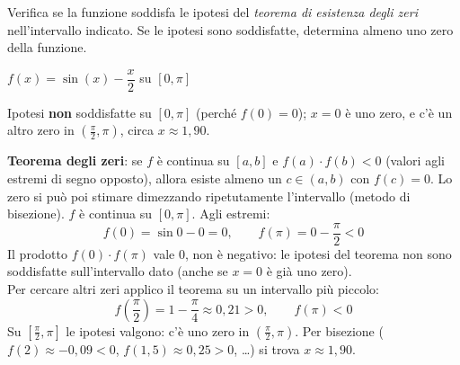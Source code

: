 \begin{question}[ID=3.2, subtitle={Teorema degli zeri per $\sin x - x/2$ su $[0,\pi]$}, tags={continuità, teorema degli zeri}, difficulty=facile]
Verifica se la funzione soddisfa le ipotesi del \textit{teorema di esistenza degli zeri} nell'intervallo indicato. Se le ipotesi sono soddisfatte, determina almeno uno zero della funzione.
\begin{center}
    $f(x) = \sin(x) - \dfrac{x}{2}$ su $[0, \pi]$
\end{center}
\begin{solution}
Ipotesi \textbf{non} soddisfatte su $[0,\pi]$ (perché $f(0)=0$); $x=0$ è uno zero, e c'è un altro zero in $\left(\tfrac\pi2,\pi\right)$, circa $x\approx1{,}90$.
\end{solution}
\begin{explanation}
\textbf{Teorema degli zeri}: se $f$ è continua su $[a,b]$ e $f(a)\cdot f(b)<0$ (valori agli estremi di segno opposto), allora esiste almeno un $c\in(a,b)$ con $f(c)=0$. Lo zero si può poi stimare dimezzando ripetutamente l'intervallo (metodo di bisezione).
$f$ è continua su $[0,\pi]$. Agli estremi:
\[ f(0)=\sin0-0=0, \qquad f(\pi)=0-\dfrac\pi2<0 \]
Il prodotto $f(0)\cdot f(\pi)$ vale $0$, non è negativo: le ipotesi del teorema non sono soddisfatte sull'intervallo dato (anche se $x=0$ è già uno zero). \\
Per cercare altri zeri applico il teorema su un intervallo più piccolo:
\[ f\!\left(\dfrac\pi2\right)=1-\dfrac\pi4\approx0{,}21>0, \qquad f(\pi)<0 \]
Su $\left[\tfrac\pi2,\pi\right]$ le ipotesi valgono: c'è uno zero in $\left(\tfrac\pi2,\pi\right)$. Per bisezione ($f(2)\approx-0{,}09<0$, $f(1{,}5)\approx0{,}25>0$, \ldots) si trova $x\approx1{,}90$.
\end{explanation}
\end{question}


